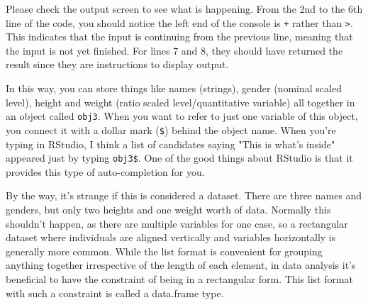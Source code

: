 \documentclass{ltjsbook}
\begin{document}
Please check the output screen to see what is happening. From the 2nd to the 6th line of the code, you should notice the left end of the console is \verb|+| rather than \verb|>|. This indicates that the input is continuing from the previous line, meaning that the input is not yet finished. For lines 7 and 8, they should have returned the result since they are instructions to display output.

In this way, you can store things like names (strings), gender (nominal scaled level), height and weight (ratio scaled level/quantitative variable) all together in an object called \texttt{obj3}. When you want to refer to just one variable of this object, you connect it with a dollar mark (\verb|$|) behind the object name. When you're typing in RStudio, I think a list of candidates saying "This is what's inside" appeared just by typing \verb|obj3$|. One of the good things about RStudio is that it provides this type of auto-completion for you.

By the way, it's strange if this is considered a dataset. There are three names and genders, but only two heights and one weight worth of data. Normally this shouldn't happen, as there are multiple variables for one case, so a rectangular dataset where individuals are aligned vertically and variables horizontally is generally more common. While the list format is convenient for grouping anything together irrespective of the length of each element, in data analysis it's beneficial to have the constraint of being in a rectangular form. This list format with such a constraint is called a data.frame type.
\end{document}
